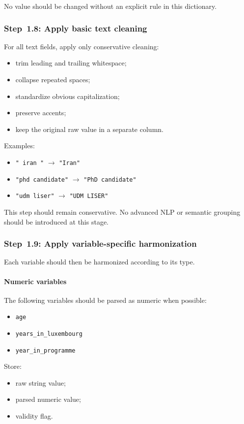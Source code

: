 No value should be changed without an explicit rule in this dictionary.

\subsubsection{Step~1.8: Apply basic text cleaning}
For all text fields, apply only conservative cleaning:
\begin{itemize}
    \item trim leading and trailing whitespace;
    \item collapse repeated spaces;
    \item standardize obvious capitalization;
    \item preserve accents;
    \item keep the original raw value in a separate column.
\end{itemize}

Examples:
\begin{itemize}
    \item \texttt{" iran "} $\rightarrow$ \texttt{"Iran"}
    \item \texttt{"phd candidate"} $\rightarrow$ \texttt{"PhD candidate"}
    \item \texttt{"udm liser"} $\rightarrow$ \texttt{"UDM LISER"}
\end{itemize}

This step should remain conservative.
No advanced NLP or semantic grouping should be introduced at this stage.

\subsubsection{Step~1.9: Apply variable-specific harmonization}
Each variable should then be harmonized according to its type.

\paragraph{Numeric variables}
The following variables should be parsed as numeric when possible:
\begin{itemize}
    \item \texttt{age}
    \item \texttt{years\_in\_luxembourg}
    \item \texttt{year\_in\_programme}
\end{itemize}

Store:
\begin{itemize}
    \item raw string value;
    \item parsed numeric value;
    \item validity flag.
\end{itemize}

